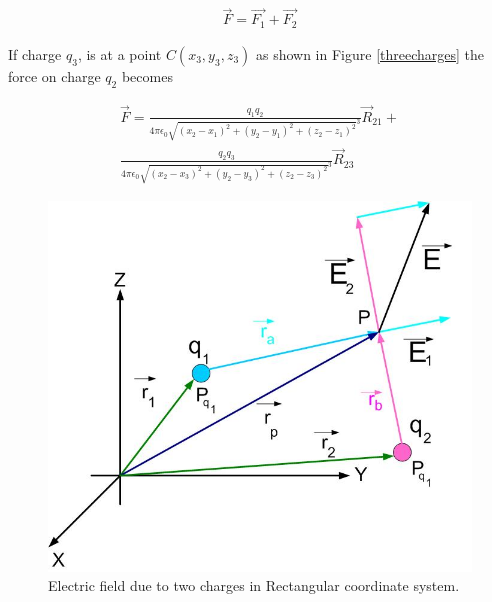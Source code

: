 \documentclass{ximera}
\begin{document}
\begin{eqnarray}
\vec{F}=\vec{F_1} + \vec{F_2} 
\end{eqnarray}




If charge $q_3$, is at a point $C(x_3,y_3,z_3)$ as shown in Figure \ref{threecharges} the force on charge $q_2$  becomes

\begin{eqnarray}
\vec{F}= \frac{q_1 q_2}{4 \pi \epsilon_{0} {\sqrt{(x_2 - x_1)^2 +(y_2 - y_1)^2 +  (z_2 - z_1)^2}^3}} \vec{R}_{21} + \\ \nonumber
 \frac{q_2 q_3}{4 \pi \epsilon_{0} {\sqrt{(x_2 - x_3)^2 +(y_2 - y_3)^2 +(z_2 - z_3)^2}
}^3} \vec{R}_{23} 
\end{eqnarray}



\begin{figure}[htbp]
\begin{center}
\includegraphics[scale=0.5]{../jpg/twochargescartcoord.jpg}
\end{center}
\caption{Electric field due to two charges in  Rectangular coordinate system.}
\label{singlecharge}
\end{figure}
\end{document}
